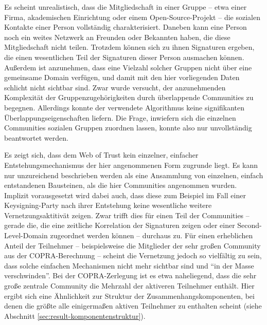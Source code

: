 Es scheint unrealistisch, dass die Mitgliedschaft in einer Gruppe --
etwa einer Firma, akademischen Einrichtung oder einem
Open-Source-Projekt -- die sozialen Kontakte einer Person
vollständig charakterisiert. Daneben kann eine Person noch ein
weites Netzwerk an Freunden oder Bekannten haben, die diese
Mitgliedschaft nicht teilen. Trotzdem können sich zu ihnen
Signaturen ergeben, die einen wesentlichen Teil der Signaturen dieser
Person ausmachen können. Außerdem ist anzunehmen, dass eine
Vielzahl solcher Gruppen nicht über eine gemeinsame Domain
verfügen, und damit mit den hier vorliegenden Daten schlicht nicht
sichtbar sind. Zwar wurde versucht, der anzunehmenden Komplexität
der Gruppenzugehörigkeiten durch überlappende Communities zu
begegnen. Allerdings konnte der verwendete Algorithmus keine
signifikanten Überlappungseigenschaften liefern. Die Frage,
inwiefern sich die einzelnen Communities sozialen Gruppen zuordnen
lassen, konnte also nur unvollständig beantwortet werden.

Es zeigt sich, dass dem Web of Trust kein einzelner, einfacher
Entstehungsmechanismus der hier angenommenen Form zugrunde liegt. Es
kann nur unzureichend beschrieben werden als eine Ansammlung von
einzelnen, einfach entstandenen Bausteinen, als die hier Communities
angenommen wurden. Implizit vorausgesetzt wird dabei auch, dass diese
zum Beispiel im Fall einer Keysigning-Party nach ihrer Entstehung
keine wesentliche weitere Vernetzungsaktitivät zeigen. Zwar trifft
dies für einen Teil der Communities -- gerade die, die eine
zeitliche Korrelation der Signaturen zeigen oder einer
Second-Level-Domain zugeordnet werden können -- durchaus zu. Für
einen erheblichen Anteil der Teilnehmer -- beispielsweise die
Mitglieder der sehr großen Community aus der COPRA-Berechnung --
scheint die Vernetzung jedoch so vielfältig zu sein, dass solche
einfachen Mechanismen nicht mehr sichtbar sind und "`in der Masse
verschwinden"'. Bei der COPRA-Zerlegung ist es etwa naheliegend, dass
die sehr große zentrale Community die Mehrzahl der aktiveren
Teilnehmer enthält. Hier ergibt sich eine Ähnlichkeit zur Struktur
der Zusammenhangskomponenten, bei denen die größte alle 
einigermaßen aktiven Teilnehmer zu enthalten scheint (siehe Abschnitt
\ref{sec:result-komponentenstruktur}).

